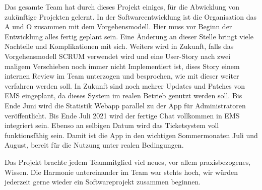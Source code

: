 Das gesamte Team hat durch dieses Projekt einiges, für die Abwicklung von zukünftige Projekten gelernt.
In der Softwareentwicklung ist die Organisation das A und O zusammen mit dem Vorgehensmodell. Hier muss vor Beginn der Entwicklung alles fertig geplant sein.
Eine Änderung an dieser Stelle bringt viele Nachteile und Komplikationen mit sich.
Weiters wird in Zukunft, falls das Vorgehensmodell SCRUM verwendet wird und eine User-Story nach zwei maligem Verschieben noch immer nicht Implementiert ist,
dises Story einem internen Review im Team unterzogen und besprochen, wie mit dieser weiter verfahren werden soll.
\newpage
In Zukunft sind noch mehrer Updates und Patches von EMS eingeplant, da dieses System im realen Betrieb genutzt werden soll. Bis Ende Juni wird die Statistik Webapp parallel zu der App für
Administratoren veröffentlicht. Bis Ende Juli 2021 wird der fertige Chat vollkommen in EMS integriert sein.
Ebenso an selbigen Datum wird das Ticketsystem voll funktionsfähig sein. Damit ist die App in den wichtigen Sommermonaten Juli und August, bereit für
die Nutzung unter realen Bedingungen.

Das Projekt brachte jedem Teammitglied viel neues, vor allem praxisbezogenes, Wissen. Die Harmonie untereinander im Team war stehts hoch, wir würden jederzeit gerne wieder ein
Softwareprojekt zusammen beginnen.